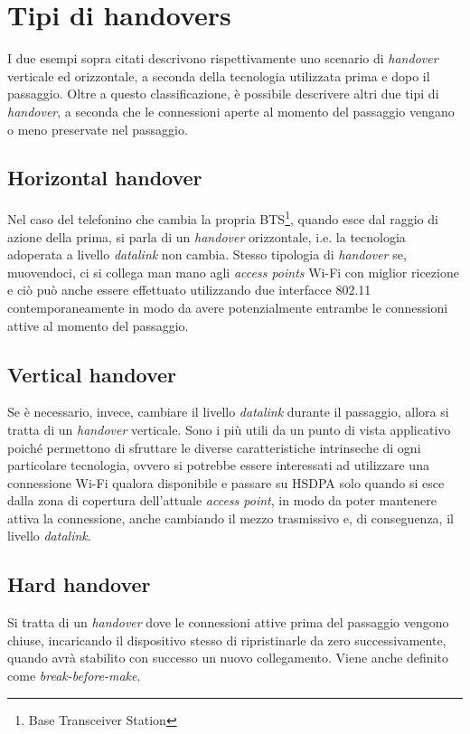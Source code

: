 \section{Tipi di handovers}

I due esempi sopra citati descrivono rispettivamente uno scenario di {\em handover} verticale ed orizzontale, a seconda della tecnologia utilizzata prima e dopo il passaggio. Oltre a questo classificazione, è possibile descrivere altri due tipi di {\em handover}, a seconda che le connessioni aperte al momento del passaggio vengano o meno preservate nel passaggio.

\subsection{Horizontal handover}
Nel caso del telefonino che cambia la propria BTS\footnote{Base Transceiver Station}, quando esce dal raggio di azione della prima, si parla di un {\em handover} orizzontale, i.e. la tecnologia adoperata a livello {\em datalink} non cambia. Stesso tipologia di {\em handover} se, muovendoci, ci si collega man mano agli {\em access points} Wi-Fi con miglior ricezione e ciò può anche essere effettuato utilizzando due interfacce 802.11 contemporaneamente in modo da avere potenzialmente entrambe le connessioni attive al momento del passaggio.

\subsection{Vertical handover}
Se è necessario, invece, cambiare il livello {\em datalink} durante il passaggio, allora si tratta di un {\em handover} verticale. Sono i più utili da un punto di vista applicativo poiché permettono di sfruttare le diverse caratteristiche intrinseche di ogni particolare tecnologia, ovvero si potrebbe essere interessati ad utilizzare una connessione Wi-Fi qualora disponibile e passare su HSDPA solo quando si esce dalla zona di copertura dell'attuale {\em access point}, in modo da poter mantenere attiva la connessione, anche cambiando il mezzo trasmissivo e, di conseguenza, il livello {\em datalink}.

\subsection{Hard handover}
Si tratta di un {\em handover} dove le connessioni attive prima del passaggio vengono chiuse, incaricando il dispositivo stesso di ripristinarle da zero successivamente, quando avrà stabilito con successo un nuovo collegamento. Viene anche definito come {\em break-before-make}.

